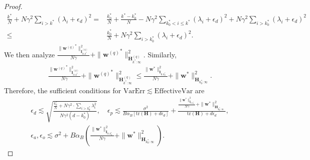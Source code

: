 \documentclass[11pt, letterpaper]{article}
\begin{document}
\begin{proof}
    \begin{equation*}
        \begin{aligned}
            \frac{k^*}{N}+N\gamma^2\sum_{i>k^*}(\lambda_i+\epsilon_d)^2
            =&\frac{k_0^*}{N}+\frac{k^*-k_0^*}{N}-N\gamma^2\sum_{k_0^*<i\leq k^*}(\lambda_i+\epsilon_d)^2+N\gamma^2\sum_{i>k_0^*}(\lambda_i+\epsilon_d)^2\\
            \leq&\frac{k_0^*}{N}+N\gamma^2\sum_{i>k_0^*}(\lambda_i+\epsilon_d)^2.
        \end{aligned}
    \end{equation*}
    We then analyze $\frac{\|{\mathbf{w}^{(q)}}^*\|_{\mathbf{I}_{0:k^*}^{(q)}}^2}{N\gamma}+\|{\mathbf{w}^{(q)}}^*\|_{\mathbf{H}_{k^*:\infty}^{(q)}}^2$. Similarly,
    \begin{equation}
        \label{eq: d1'}
        \begin{aligned}
            \frac{\|{\mathbf{w}^{(q)}}^*\|_{\mathbf{I}_{0:k^*}^{(q)}}^2}{N\gamma}+\|{\mathbf{w}^{(q)}}^*\|_{\mathbf{H}_{k^*:\infty}^{(q)}}^2\leq \frac{\|{\mathbf{w}}^*\|_{\mathbf{I}_{0:k_0^*}}^2}{N\gamma}+\|{\mathbf{w}}^*\|_{\mathbf{H}_{k_0^*:\infty}}^2.
        \end{aligned}
    \end{equation}
    Therefore, the sufficient conditions for $\mathrm{VarErr}\lesssim \mathrm{EffectiveVar}$ are
    \begin{gather*}
        \epsilon_d\lesssim \sqrt{\frac{\frac{k_0^*}{N}+N\gamma^2\cdot\sum_{i>k_0^*}\lambda_i^2}{N\gamma^2(d-k_0^*)}},\quad \epsilon_p\lesssim \frac{\sigma^2}{B\alpha_B[\mathrm{tr}(\mathbf{H})+d\epsilon_d]}+\frac{\frac{\|{\mathbf{w}}^*\|_{\mathbf{I}_{0:k_0^*}}^2}{N\gamma}+\|{\mathbf{w}}^*\|_{\mathbf{H}_{k_0^*:\infty}}^2}{\mathrm{tr}(\mathbf{H})+d\epsilon_d}, \\ \epsilon_a,\epsilon_o\lesssim \sigma^2+B\alpha_B\left(\frac{\|{\mathbf{w}}^*\|_{\mathbf{I}_{0:k_0^*}}^2}{N\gamma}+\|{\mathbf{w}}^*\|_{\mathbf{H}_{k_0^*:\infty}}^2\right).
    \end{gather*}


\end{proof}
\end{document}

